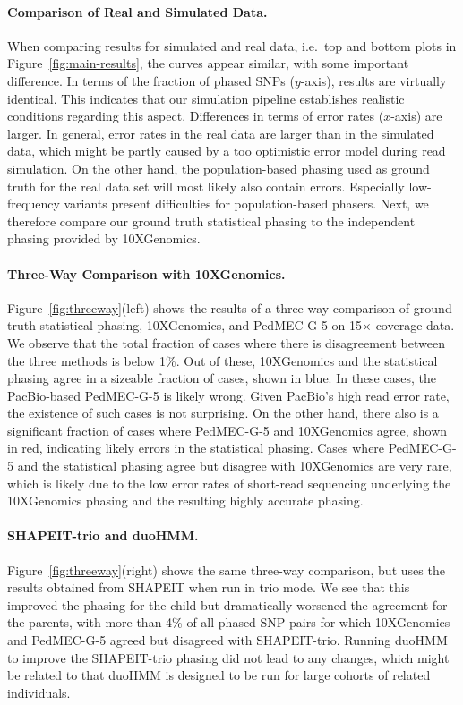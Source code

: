 \paragraph{Comparison of Real and Simulated Data.}
When comparing results for simulated and real data, i.e.\ top and bottom plots in Figure~\ref{fig:main-results}, the curves appear similar, with some important difference.
In terms of the fraction of phased SNPs ($y$-axis), results are virtually identical.
This indicates that our simulation pipeline establishes realistic conditions regarding this aspect.
Differences in terms of error rates ($x$-axis) are larger.
In general, error rates in the real data are larger than in the simulated data, which might be partly caused by a too optimistic error model during read simulation.
On the other hand, the population-based phasing used as ground truth for the real data set will most likely also contain errors.
Especially low-frequency variants present difficulties for population-based phasers.
Next, we therefore compare our ground truth statistical phasing to the independent phasing provided by 10XGenomics.

\paragraph{Three-Way Comparison with 10XGenomics.}
Figure~\ref{fig:threeway}(left) shows the results of a three-way comparison of ground truth statistical phasing, 10XGenomics, and \mbox{PedMEC-G-5} on 15$\times$ coverage data.
We observe that the total fraction of cases where there is disagreement between the three methods is below 1\%.
Out of these, 10XGenomics and the statistical phasing agree in a sizeable fraction of cases, shown in blue.
In these cases, the PacBio-based \mbox{PedMEC-G-5} is likely wrong.
Given PacBio's high read error rate, the existence of such cases is not surprising.
On the other hand, there also is a significant fraction of cases where \mbox{PedMEC-G-5} and 10XGenomics agree, shown in red, indicating likely errors in the statistical phasing.
Cases where \mbox{PedMEC-G-5} and the statistical phasing agree but disagree with 10XGenomics are very rare, which is likely due to the low error rates of short-read sequencing underlying the 10XGenomics phasing and the resulting highly accurate phasing.

\paragraph{SHAPEIT-trio and duoHMM.}
Figure~\ref{fig:threeway}(right) shows the same three-way comparison, but uses the results obtained from SHAPEIT when run in trio mode.
We see that this improved the phasing for the child but dramatically worsened the agreement for the parents, with more than 4\% of all phased SNP pairs for which 10XGenomics and \mbox{PedMEC-G-5} agreed but disagreed with SHAPEIT-trio.
Running duoHMM \citep{OConnell2014} to improve the SHAPEIT-trio phasing did not lead to any changes, which might be related to that duoHMM is designed to be run for large cohorts of related individuals.

